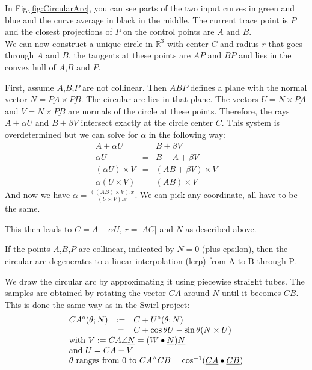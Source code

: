 \documentclass[journal, letterpaper]{IEEEtran}
\begin{document}
In Fig.\ref{fig:CircularArc}, you can see parts of the two input curves in green and blue and the curve average in black in the middle. The current trace point is $P$ and the closest projections of $P$ on the control points are $A$ and $B$. \\
We can now construct a unique circle in $\mathbb{R}^3$ with center $C$ and radius $r$ that goes through $A$ and $B$, the tangents at these points are $AP$ and $BP$ and lies in the convex hull of $A$,$B$ and $P$.

First, assume $A$,$B$,$P$ are not collinear. Then $ABP$ defines a plane with the normal vector $N=\underline{PA} \times \underline{PB}$. The circular arc lies in that plane. The vectors $U=N \times \underline{PA}$ and $V=N \times \underline{PB}$ are normals of the circle at these points.
Therefore, the rays $A+\alpha U$ and $B+\beta V$ intersect exactly at the circle center $C$.
This system is overdetermined but we can solve for $\alpha$ in the following way:
\begin{equation}
\begin{array}{rcl}
A + \alpha U &=& B + \beta V \\
\alpha U &=& B-A+\beta V \\
(\alpha U) \times V &=& (AB+\beta V) \times V \\
\alpha (U\times V) &=& (AB) \times V
\end{array}
\label{eq:CircArc}
\end{equation}
And now we have $\alpha = \frac{ ((AB)\times V).x }{ (U \times V).x}$. We can pick any coordinate, all have to be the same.

This then leads to $C=A + \alpha U$, $r=|AC|$ and $N$ as described above.

If the points $A$,$B$,$P$ are collinear, indicated by $N=0$ (plus epsilon), then the circular arc degenerates to a linear interpolation (lerp) from A to B through P.

We draw the circular arc by approximating it using piecewise straight tubes. The samples are obtained by rotating the vector $CA$ around $N$ until it becomes $CB$. This is done the same way as in the Swirl-project:
\begin{equation}
\begin{array}{lcl}
 CA^{\circ}(\theta; N) &:=& C + U^{\circ}(\theta; N) \\
                        & =& C + \cos \theta U - \sin \theta (N \times U)\\
 \multicolumn{3}{l}{\text{with } V := CA\angle\underline{N} = (W\bullet\underline{N})\underline{N}} \\
 \multicolumn{3}{l}{\text{and } U = CA-V} \\
 \multicolumn{3}{l}{\theta \text{ ranges from } 0 \text{ to } CA^{\wedge}CB=\cos^{-1}(\underline{CA}\bullet\underline{CB})}
\end{array}
\label{eq:Rot}
\end{equation}
\end{document}
